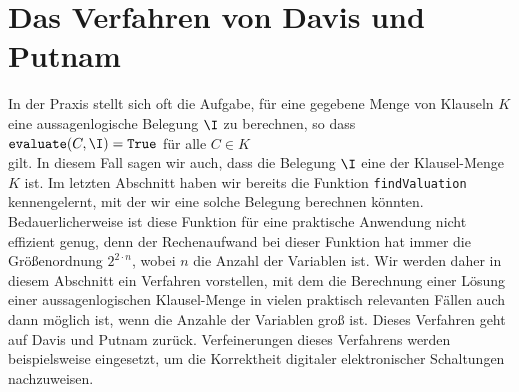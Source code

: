 \section{Das Verfahren von Davis und Putnam}
In der Praxis stellt sich oft die Aufgabe, für eine gegebene Menge von Klauseln $K$ eine aussagenlogische
Belegung $\I$ zu berechnen, so dass 
\\[0.2cm]
\hspace*{1.3cm} $\texttt{evaluate}(C,\I) = \texttt{True}$ \quad für alle $C\in K$ \\[0.2cm]
gilt.  In diesem Fall sagen wir auch, dass die Belegung $\I$ eine  der
 Klausel-Menge $K$ ist.  Im letz\-ten Abschnitt haben wir bereits die Funktion \texttt{findValuation}
 kennengelernt, mit der wir eine solche Belegung berechnen könnten.
Bedauerlicherweise ist diese Funktion für eine praktische Anwendung nicht effizient genug, denn der
Rechenaufwand bei dieser Funktion hat immer die Größenordnung $2^{2\cdot n}$, wobei $n$ die Anzahl der Variablen ist.
Wir werden daher in diesem Abschnitt ein Verfahren vorstellen, mit dem die Berechnung einer Lösung
einer aussagenlogischen Klausel-Menge in vielen praktisch relevanten Fällen auch dann möglich ist, wenn die
Anzahle der Variablen groß ist.  Dieses Verfahren geht auf Davis und Putnam
\cite{davis:1960, davis:1962} zurück.  Verfeinerungen dieses Verfahrens werden beispielsweise
eingesetzt, um die Korrektheit digitaler elektronischer Schaltungen nachzuweisen.  

